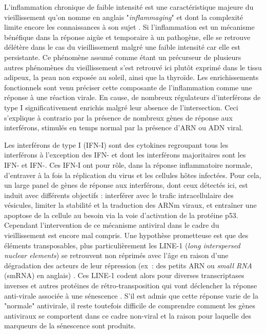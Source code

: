 L'inflammation chronique de faible intensité est une caractéristique majeure du vieillissement qu'on nomme en anglais "\textit{inflammaging}"  et dont la complexité limite encore les connaissances à son sujet . Si l'inflammation est un mécanisme bénéfique dans la réponse aigüe et temporaire à un pathogène, elle se retrouve délétère dans le cas du vieillissement malgré une faible intensité car elle est persistante. Ce phénomène assumé comme étant un précurseur de plusieurs autres phénomènes du vieillissement  s'est retrouvé ici plutôt exprimé dans le tissu adipeux, la peau non exposée au soleil, ainsi que la thyroïde. Les enrichissements fonctionnels sont venu préciser cette composante de l'inflammation comme une réponse à une réaction virale. En cause, de nombreux régulateurs d'interférons de type I significativement enrichis malgré leur absence de l'intersection. Ceci s'explique à contrario par la présence de nombreux gènes de réponse aux interférons, stimulés en temps normal par la présence d'ARN ou ADN viral.

Les interférons de type I (IFN-I) sont des cytokines regroupant tous les interférons à l'exception des IFN-\textgamma{} et dont les interférons majoritaires sont les IFN-\textalpha{} et IFN-\textbeta{}. Ces IFN-I ont pour rôle, dans la réponse inflammatoire normale, d'entraver à la fois la réplication du virus et les cellules hôtes infectées. Pour cela, un large panel de gènes de réponse aux interférons, dont ceux détectés ici, est induit avec différents objectifs : interférer avec le trafic intracellulaire des vésicules, limiter la stabilité et la traduction des ARNm viraux, et entraîner une apoptose de la cellule au besoin via la voie d'activation de la protéine p53. Cependant l'intervention de ce mécanisme antiviral dans le cadre du vieillissement est encore mal compris. Une hypothèse prometteuse est que des éléments transposables, plus particulièrement les LINE-1 (\textit{long interspersed nuclear elements}) se retrouvent non réprimés avec l'âge en raison d'une dégradation des acteurs de leur répression (ex : des petits ARN ou \textit{small RNA} (smRNA) en anglais) . Ces LINE-1 codent alors pour diverses transcriptases inverses et autres protéines de rétro-transposition qui vont déclencher la réponse anti-virale associée à une sénescence . S'il est admis que cette réponse varie de la "normale" antivirale, il reste toutefois difficile de comprendre comment les gènes antiviraux se comportent dans ce cadre non-viral  et la raison pour laquelle des marqueurs de la sénescence sont produits.

